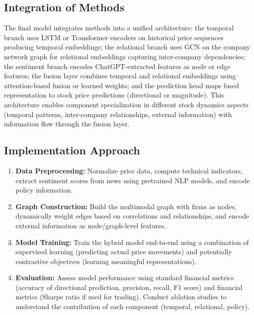 \subsection{Integration of Methods}

The final model integrates methods into a unified architecture: the temporal branch uses LSTM or Transformer encoders on historical price sequences producing temporal embeddings; the relational branch uses GCN on the company network graph for relational embeddings capturing inter-company dependencies; the sentiment branch encodes ChatGPT-extracted features as node or edge features; the fusion layer combines temporal and relational embeddings using attention-based fusion or learned weights; and the prediction head maps fused representation to stock price predictions (directional or magnitude). This architecture enables component specialization in different stock dynamics aspects (temporal patterns, inter-company relationships, external information) with information flow through the fusion layer.

\subsection{Implementation Approach}

\begin{enumerate}
    \item \textbf{Data Preprocessing:} Normalize price data, compute technical indicators, extract sentiment scores from news using pretrained NLP models, and encode policy information.
    
    \item \textbf{Graph Construction:} Build the multimodal graph with firms as nodes, dynamically weight edges based on correlations and relationships, and encode external information as node/graph-level features.
    
    \item \textbf{Model Training:} Train the hybrid model end-to-end using a combination of supervised learning (predicting actual price movements) and potentially contrastive objectives (learning meaningful representations).
    
    \item \textbf{Evaluation:} Assess model performance using standard financial metrics (accuracy of directional prediction, precision, recall, F1 score) and financial metrics (Sharpe ratio if used for trading). Conduct ablation studies to understand the contribution of each component (temporal, relational, policy).
\end{enumerate}

